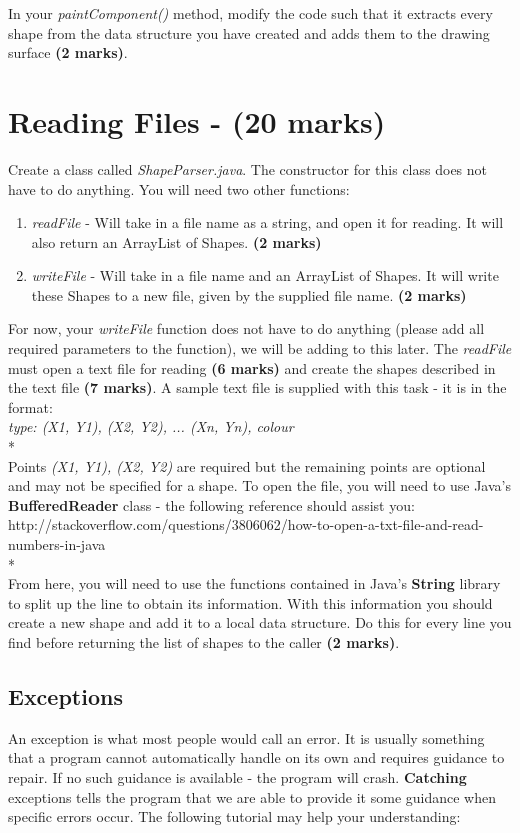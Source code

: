 \documentclass[a4paper,12pt]{article}
\begin{document}
In your \textit{paintComponent()} method, modify the code such that it extracts every shape from the data structure you have created and adds them to the drawing surface {\bf (2 marks)}.

\newpage
\section{Reading Files - (20 marks)}
Create a class called \textit{ShapeParser.java}. The constructor for this class does not have to do anything. You will need two other functions:
\begin{enumerate}
\item \textit{readFile} - Will take in a file name as a string, and open it for reading. It will also return an ArrayList of Shapes. {\bf (2 marks)}
\item \textit{writeFile} - Will take in a file name and an ArrayList of Shapes. It will write these Shapes to a new file, given by the supplied file name. {\bf (2 marks)}
\end{enumerate}
For now, your \textit{writeFile} function does not have to do anything (please add all required parameters to the function), we will be adding to this later. The \textit{readFile} must open a text file for reading {\bf (6 marks)} and create the shapes described in the text file {\bf (7 marks)}. A sample text file is supplied with this task - it is in the format:\\

\textit{type: (X1, Y1), (X2, Y2), ... (Xn, Yn), colour}\\*
\\
Points \textit{(X1, Y1), (X2, Y2)} are required but the remaining points are optional and may not be specified for a shape. To open the file, you will need to use Java's {\bf BufferedReader} class - the following reference should assist you:\\

http://stackoverflow.com/questions/3806062/how-to-open-a-txt-file-and-read-numbers-in-java\\*
\\
From here, you will need to use the functions contained in Java's {\bf String} library to split up the line to obtain its information. With this information you should create a new shape and add it to a local data structure. Do this for every line you find before returning the list of shapes to the caller {\bf (2 marks)}. 

\subsection*{Exceptions}
An exception is what most people would call an error. It is usually something that a program cannot automatically handle on its own and requires guidance to repair. If no such guidance is available - the program will crash. {\bf Catching} exceptions tells the program that we are able to provide it some guidance when  specific errors occur. The following tutorial may help your understanding:\\
\end{document}
